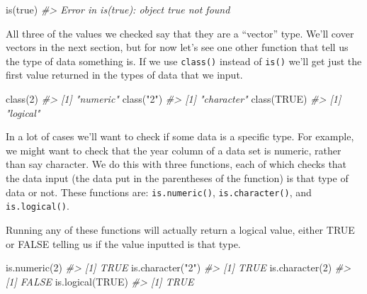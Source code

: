 \documentclass[
]{krantz}
\makeatletter
\newenvironment{Shaded}{\begin{snugshade}}{\end{snugshade}}
\newcommand{\CommentTok}[1]{\textcolor[rgb]{0.37,0.37,0.37}{\textit{#1}}}
\newcommand{\ConstantTok}[1]{\textcolor[rgb]{0,0,0}{#1}}
\newcommand{\DecValTok}[1]{\textcolor[rgb]{0.06,0.06,0.06}{#1}}
\newcommand{\FunctionTok}[1]{\textcolor[rgb]{0,0,0}{#1}}
\newcommand{\NormalTok}[1]{#1}
\newcommand{\StringTok}[1]{\textcolor[rgb]{0.5,0.5,0.5}{#1}}
\newenvironment{kframe}{%
\medskip{}
\setlength{\fboxsep}{.8em}
 \def\at@end@of@kframe{}%
 \ifinner\ifhmode%
  \def\at@end@of@kframe{\end{minipage}}%
  \begin{minipage}{\columnwidth}%
 \fi\fi%
 \def\FrameCommand##1{\hskip\@totalleftmargin \hskip-\fboxsep
 \colorbox{shadecolor}{##1}\hskip-\fboxsep
     \hskip-\linewidth \hskip-\@totalleftmargin \hskip\columnwidth}%
 \MakeFramed {\advance\hsize-\width
   \@totalleftmargin\z@ \linewidth\hsize
   \@setminipage}}%
 {\par\unskip\endMakeFramed%
 \at@end@of@kframe}
\renewenvironment{Shaded}{\begin{kframe}}{\end{kframe}}
\makeatother
\begin{document}
\begin{Shaded}
\begin{Highlighting}[]
\FunctionTok{is}\NormalTok{(true)}
\CommentTok{\#\textgreater{} Error in is(true): object \textquotesingle{}true\textquotesingle{} not found}
\end{Highlighting}
\end{Shaded}

All three of the values we checked say that they are a
``vector'' type. We'll cover vectors in the next section,
but for now let's see one other function that tell us the
type of data something is. If we use \texttt{class()}
instead of \texttt{is()} we'll get just the first value
returned in the types of data that we input.

\begin{Shaded}
\begin{Highlighting}[]
\FunctionTok{class}\NormalTok{(}\DecValTok{2}\NormalTok{)}
\CommentTok{\#\textgreater{} [1] "numeric"}
\FunctionTok{class}\NormalTok{(}\StringTok{"2"}\NormalTok{)}
\CommentTok{\#\textgreater{} [1] "character"}
\FunctionTok{class}\NormalTok{(}\ConstantTok{TRUE}\NormalTok{)}
\CommentTok{\#\textgreater{} [1] "logical"}
\end{Highlighting}
\end{Shaded}

In a lot of cases we'll want to check if some data is a
specific type. For example, we might want to check that the
year column of a data set is numeric, rather than say
character. We do this with three functions, each of which
checks that the data input (the data put in the parentheses
of the function) is that type of data or not. These
functions are: \texttt{is.numeric()},
\texttt{is.character()}, and \texttt{is.logical()}.

Running any of these functions will actually return a
logical value, either TRUE or FALSE telling us if the value
inputted is that type.

\begin{Shaded}
\begin{Highlighting}[]
\FunctionTok{is.numeric}\NormalTok{(}\DecValTok{2}\NormalTok{)}
\CommentTok{\#\textgreater{} [1] TRUE}
\FunctionTok{is.character}\NormalTok{(}\StringTok{"2"}\NormalTok{)}
\CommentTok{\#\textgreater{} [1] TRUE}
\FunctionTok{is.character}\NormalTok{(}\DecValTok{2}\NormalTok{)}
\CommentTok{\#\textgreater{} [1] FALSE}
\FunctionTok{is.logical}\NormalTok{(}\ConstantTok{TRUE}\NormalTok{)}
\CommentTok{\#\textgreater{} [1] TRUE}
\end{Highlighting}
\end{Shaded}
\end{document}
